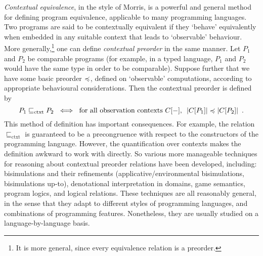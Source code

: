 \emph{Contextual equivalence}, in the style of Morris,
is a powerful and general method for defining program equivalence, applicable to many 
programming languages. 
Two programs are said to be contextually equivalent if 
they `behave' equivalently when embedded in any suitable context that leads to `observable' behaviour. 
More generally,\footnote{It is more general, since every equivalence relation is a preorder.} one can define \emph{contextual preorder} in the same manner. Let $P_1$ and $P_2$ be comparable programs (for example, in a typed language, $P_1$ and $P_2$ would  have the same type in order to be comparable). Suppose further  that we have some {basic preorder} $\preccurlyeq$, defined on `observable' computations, according to appropriate behavioural considerations. Then the contextual preorder is defined by
\begin{equation}
\label{equation:contextual-preorder}
P_1 \sqsubseteq_\text{ctxt} P_2 ~ \iff ~
\text{for all observation contexts $C[-]$, $~ |C[P_1]| \preccurlyeq |C[P_2]|$} \enspace . 
\end{equation}
This method of definition has important consequences. For example, the relation
$\sqsubseteq_\text{ctxt}$ is guaranteed to be a precongruence with respect 
to the constructors of the programming language.
However, the quantification over contexts makes the definition awkward to work with directly.
So various more manageable techniques for reasoning about contextual preorder relations have been developed, including:
bisimulations 
and their refinements (applicative/environmental bisimulations, 
bisimulations up-to), %
denotational interpretation in domains, %
game semantics, %
program logics,
and logical relations. %
These techniques are all reasonably general, in the sense that they adapt to different styles of programming languages, and combinations of programming features. Nonetheless, they are usually studied on a language-by-language basis.


